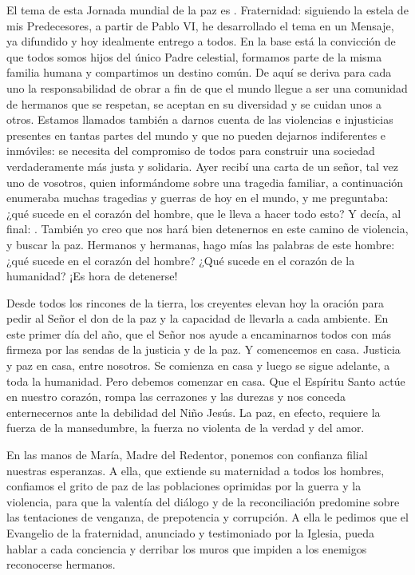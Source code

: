 \begin{body}
\begin{body}
{El tema de esta Jornada mundial de la paz es }. Fraternidad: siguiendo la estela de mis Predecesores, a partir de Pablo VI, he desarrollado el tema en un Mensaje, ya difundido y hoy idealmente entrego a todos. En la base está la convicción de que todos somos hijos del único Padre celestial, formamos parte de la misma familia humana y compartimos un destino común. De aquí se deriva para cada uno la responsabilidad de obrar a fin de que el mundo llegue a ser una comunidad de hermanos que se respetan, se aceptan en su diversidad y se cuidan unos a otros. Estamos llamados también a darnos cuenta de las violencias e injusticias presentes en tantas partes del mundo y que no pueden dejarnos indiferentes e inmóviles: se necesita del compromiso de todos para construir una sociedad verdaderamente más justa y solidaria. Ayer recibí una carta de un señor, tal vez uno de vosotros, quien informándome sobre una tragedia familiar, a continuación enumeraba muchas tragedias y guerras de hoy en el mundo, y me preguntaba: ¿qué sucede en el corazón del hombre, que le lleva a hacer todo esto? Y decía, al final: . También yo creo que nos hará bien detenernos en este camino de violencia, y buscar la paz. Hermanos y hermanas, hago mías las palabras de este hombre: ¿qué sucede en el corazón del hombre? ¿Qué sucede en el corazón de la humanidad? ¡Es hora de detenerse!

Desde todos los rincones de la tierra, los creyentes elevan hoy la oración para pedir al Señor el don de la paz y la capacidad de llevarla a cada ambiente. En este primer día del año, que el Señor nos ayude a encaminarnos todos con más firmeza por las sendas de la justicia y de la paz. Y comencemos en casa. Justicia y paz en casa, entre nosotros. Se comienza en casa y luego se sigue adelante, a toda la humanidad. Pero debemos comenzar en casa. Que el Espíritu Santo actúe en nuestro corazón, rompa las cerrazones y las durezas y nos conceda enternecernos ante la debilidad del Niño Jesús. La paz, en efecto, requiere la fuerza de la mansedumbre, la fuerza no violenta de la verdad y del amor.

En las manos de María, Madre del Redentor, ponemos con confianza filial nuestras esperanzas. A ella, que extiende su maternidad a todos los hombres, confiamos el grito de paz de las poblaciones oprimidas por la guerra y la violencia, para que la valentía del diálogo y de la reconciliación predomine sobre las tentaciones de venganza, de prepotencia y corrupción. A ella le pedimos que el Evangelio de la fraternidad, anunciado y testimoniado por la Iglesia, pueda hablar a cada conciencia y derribar los muros que impiden a los enemigos reconocerse hermanos.


\end{body}
\end{body}
